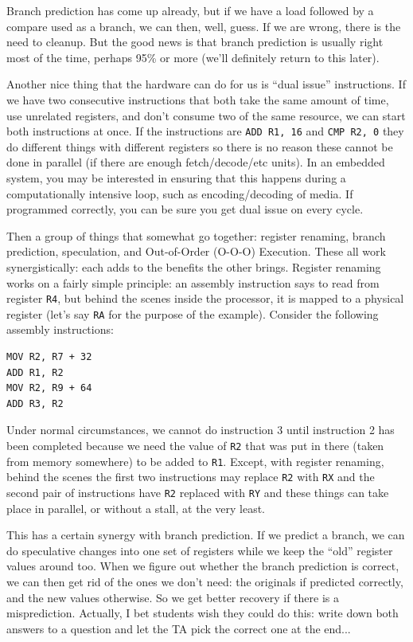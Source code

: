 \documentclass[a4paper]{report}
\begin{document}
Branch prediction has come up already, but if we have a load followed by a compare used as a branch, we can then, well, guess. If we are wrong, there is the need to cleanup. But the good news is that branch prediction is usually right most of the time, perhaps 95\% or more (we'll definitely return to this later).

Another nice thing that the hardware can do for us is ``dual issue'' instructions. If we have two consecutive instructions that both take the same amount of time, use unrelated registers, and don't consume two of the same resource, we can start both instructions at once. If the instructions are \texttt{ADD R1, 16} and \texttt{CMP R2, 0} they do different things with different registers so there is no reason these cannot be done in parallel (if there are enough fetch/decode/etc units). In an embedded system, you may be interested in ensuring that this happens during a computationally intensive loop, such as encoding/decoding of media. If programmed correctly, you can be sure you get dual issue on every cycle.

Then a group of things that somewhat go together: register renaming, branch prediction, speculation, and Out-of-Order (O-O-O) Execution. These all work synergistically: each adds to the benefits the other brings. Register renaming works on a fairly simple principle: an assembly instruction says to read from register \texttt{R4}, but behind the scenes inside the processor, it is mapped to a physical register (let's say \texttt{RA} for the purpose of the example). Consider the following assembly instructions:

\begin{verbatim}
MOV R2, R7 + 32
ADD R1, R2
MOV R2, R9 + 64
ADD R3, R2
\end{verbatim}

Under normal circumstances, we cannot do instruction 3 until instruction 2 has been completed because we need the value of \texttt{R2} that was put in there (taken from memory somewhere) to be added to \texttt{R1}. Except, with register renaming, behind the scenes the first two instructions may replace \texttt{R2} with \texttt{RX} and the second pair of instructions have \texttt{R2} replaced with \texttt{RY} and these things can take place in parallel, or without a stall, at the very least.

This has a certain synergy with branch prediction. If we predict a branch, we can do speculative changes into one set of registers while we keep the ``old'' register values around too. When we figure out whether the branch prediction is correct, we can then get rid of the ones we don't need: the originals if predicted correctly, and the new values otherwise. So we get better recovery if there is a misprediction. Actually, I bet students wish they could do this: write down both answers to a question and let the TA pick the correct one at the end...
\end{document}
